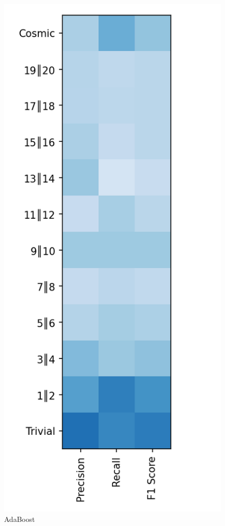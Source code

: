 \documentclass{article}
\begin{document}
\begin{figure}[ht]
\begin{minipage}[b]{0.32\linewidth}
			\caption*{AdaBoost} 
			\vspace{10ex}
		\end{minipage} \hfill
		\begin{minipage}[b]{0.32\linewidth}
			\centering
			\includegraphics[width=\linewidth]{12 - Decision Tree.png} 

\end{minipage}
\end{figure}
\end{document}
